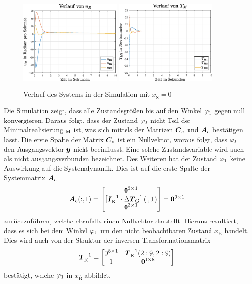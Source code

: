 \begin{figure}[!ht]\ContinuedFloat
\centering
\includegraphics[width=0.45\textwidth]{img/lin_sim1_ur.eps}\hspace{0.7cm}
\includegraphics[width=0.45\textwidth]{img/lin_sim1_tm.eps}
\caption{Verlauf des Systems in der Simulation mit $x_{\overline{\text{S}}}=0$}
\end{figure}
Die Simulation zeigt, dass alle Zustandsgrößen bis auf den Winkel $\varphi_{\text{1}}$ gegen null konvergieren. Daraus folgt, dass der Zustand $\varphi_{\text{1}}$ nicht Teil der Minimalrealisierung $_{\text{M}}$ ist, was sich mittels der Matrizen $\boldsymbol{C}_{\text{c}}$ und $\boldsymbol{A}_{\text{c}}$ bestätigen lässt. Die erste Spalte der Matrix $\boldsymbol{C}_{\text{c}}$ ist ein Nullvektor, woraus folgt, dass $\varphi_{\text{1}}$ den Ausgangsvektor $\boldsymbol{y}$ nicht beeinflusst. Eine solche Zustandsvariable wird auch als nicht ausgangsverbunden bezeichnet. Des Weiteren hat der Zustand $\varphi_{\text{1}}$ keine Auswirkung auf die Systemdynamik. Dies ist auf die erste Spalte der Systemmatrix $\boldsymbol{A}_{\text{c}}$
\begin{equation}
\boldsymbol{A}_{\text{c}}(:,1) = \begin{bmatrix}
\boldsymbol{0}^{3\times 1} \\ \left[\boldsymbol{I}^{-1}_{\text{K}}\cdot \Delta\boldsymbol{T}_{\text{G}}\right](:,1)\\ \boldsymbol{0}^{3\times 1}
\end{bmatrix} = \boldsymbol{0}^{9\times 1}
\end{equation}
zurückzuführen, welche ebenfalls einen Nullvektor darstellt. Hieraus resultiert, dass es sich bei dem Winkel $\varphi_{\text{1}}$ um den nicht beobachtbaren Zustand $x_{\overline{\text{B}}}$ handelt. Dies wird auch von der Struktur der inversen Transformationsmatrix
\begin{equation}
\boldsymbol{T}^{-1}_{\text{K}} = \begin{bmatrix}
\boldsymbol{0}^{8\times 1} & \boldsymbol{T}^{-1}_{\text{K}}(2:9,2:9) \\
1 & \boldsymbol{0}^{1\times 8}
\end{bmatrix}
\end{equation}
bestätigt, welche $\varphi_{\text{1}}$ in $x_{\overline{\text{B}}}$ abbildet.

